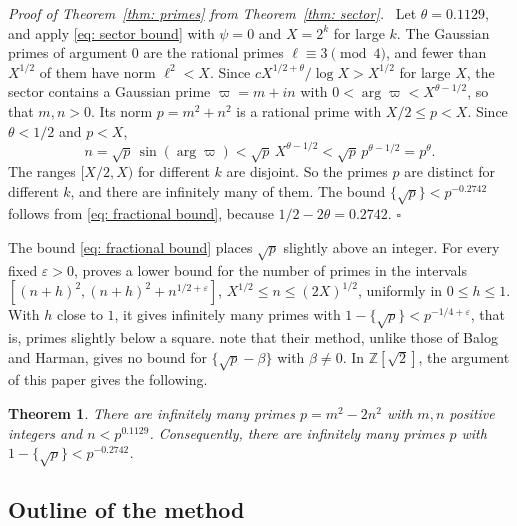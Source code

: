 \documentclass{article}
\numberwithin{equation}{section}
\newtheorem{theorem}{Theorem}
\newenvironment{proof}[1][Proof]{\par\medskip\noindent\textit{#1.}\ }{\hfill$\square$\par\medskip}
\newcommand{\Le}{\leqslant}
\begin{document}
\begin{proof}[Proof of Theorem~\ref{thm: primes} from Theorem~\ref{thm: sector}]
Let $\theta = 0.1129$, and apply \eqref{eq: sector bound} with $\psi = 0$ and $X = 2^k$ for large $k$. The Gaussian primes of argument $0$ are the rational primes $\ell \equiv 3 \pmod 4$, and fewer than $X^{1/2}$ of them have norm $\ell^2 < X$. Since $c X^{1/2 + \theta}/\log X > X^{1/2}$ for large $X$, the sector contains a Gaussian prime $\varpi = m + in$ with $0 < \arg \varpi < X^{\theta - 1/2}$, so that $m, n > 0$. Its norm $p = m^2 + n^2$ is a rational prime with $X/2 \Le p < X$. Since $\theta < 1/2$ and $p < X$,
\begin{equation*}
n = \sqrt{p}\, \sin(\arg \varpi) < \sqrt{p}\, X^{\theta - 1/2} < \sqrt{p}\, p^{\theta - 1/2} = p^{\theta}.
\end{equation*}
The ranges $[X/2, X)$ for different $k$ are disjoint. So the primes $p$ are distinct for different $k$, and there are infinitely many of them. The bound $\{\sqrt{p}\} < p^{-0.2742}$ follows from \eqref{eq: fractional bound}, because $1/2 - 2\theta = 0.2742$.
\end{proof}

The bound \eqref{eq: fractional bound} places $\sqrt{p}$ slightly above an integer. For every fixed $\varepsilon > 0$, \citet[Chapter~9]{harman1982diophantine} proves a lower bound for the number of primes in the intervals $[(n + h)^2, (n + h)^2 + n^{1/2 + \varepsilon}]$, $X^{1/2} \Le n \Le (2X)^{1/2}$, uniformly in $0 \Le h \Le 1$. With $h$ close to $1$, it gives infinitely many primes with $1 - \{\sqrt{p}\} < p^{-1/4 + \varepsilon}$, that is, primes slightly below a square. \citet[p.~120]{harman2001gaussian} note that their method, unlike those of Balog and Harman, gives no bound for $\{\sqrt{p} - \beta\}$ with $\beta \neq 0$. In $\mathbb{Z}[\sqrt{2}]$, the argument of this paper gives the following.

\begin{theorem}
\label{thm: below square}
There are infinitely many primes $p = m^2 - 2n^2$ with $m, n$ positive integers and $n < p^{0.1129}$. Consequently, there are infinitely many primes $p$ with $1 - \{\sqrt{p}\} < p^{-0.2742}$.
\end{theorem}

\subsection{Outline of the method}
\label{subsec: method}
\end{document}
